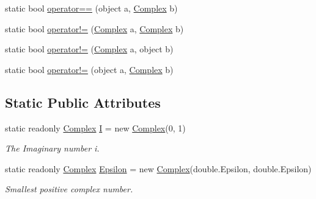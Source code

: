 \begin{DoxyCompactItemize}
\item 
static bool \hyperlink{struct_solar_liner_1_1_complex_number_1_1_complex_a85a0a900f8faced93c490bfb6f7dd74d}{operator==} (object a, \hyperlink{struct_solar_liner_1_1_complex_number_1_1_complex}{Complex} b)
\item 
static bool \hyperlink{struct_solar_liner_1_1_complex_number_1_1_complex_a732461b2340bbb04857ee34e8c3c4eca}{operator!=} (\hyperlink{struct_solar_liner_1_1_complex_number_1_1_complex}{Complex} a, \hyperlink{struct_solar_liner_1_1_complex_number_1_1_complex}{Complex} b)
\item 
static bool \hyperlink{struct_solar_liner_1_1_complex_number_1_1_complex_afbf0c3440c98b50a3df065666f28762d}{operator!=} (\hyperlink{struct_solar_liner_1_1_complex_number_1_1_complex}{Complex} a, object b)
\item 
static bool \hyperlink{struct_solar_liner_1_1_complex_number_1_1_complex_a3431cb682dda6d05dbb02fd1c8b87576}{operator!=} (object a, \hyperlink{struct_solar_liner_1_1_complex_number_1_1_complex}{Complex} b)
\end{DoxyCompactItemize}
\subsection*{Static Public Attributes}
\begin{DoxyCompactItemize}
\item 
static readonly \hyperlink{struct_solar_liner_1_1_complex_number_1_1_complex}{Complex} \hyperlink{struct_solar_liner_1_1_complex_number_1_1_complex_acc1fad2ea19dcd2fae4cd17279edb99d}{I} = new \hyperlink{struct_solar_liner_1_1_complex_number_1_1_complex}{Complex}(0, 1)
\begin{DoxyCompactList}\small\item\em The Imaginary number i. \end{DoxyCompactList}\item 
static readonly \hyperlink{struct_solar_liner_1_1_complex_number_1_1_complex}{Complex} \hyperlink{struct_solar_liner_1_1_complex_number_1_1_complex_a2e7f3499954b312a4676b6b16738f53e}{Epsilon} = new \hyperlink{struct_solar_liner_1_1_complex_number_1_1_complex}{Complex}(double.\+Epsilon, double.\+Epsilon)
\begin{DoxyCompactList}\small\item\em Smallest positive complex number. \end{DoxyCompactList}\end{DoxyCompactItemize}
